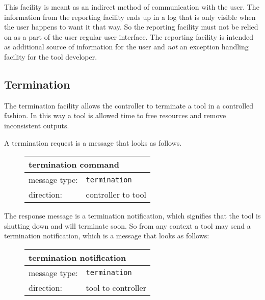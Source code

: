 \documentclass{article}
\newcommand{\msg}[1]{\texttt{#1}}
\begin{document}
   \noindent This facility is meant as an indirect method of communication with
   the user. The information from the reporting facility ends up in a log that
   is only visible when the user happens to want it that way. So the reporting
   facility must not be relied on as a part of the user regular user interface.
   The reporting facility is intended as additional source of information for
   the user and \emph{not} an exception handling facility for the tool
   developer.

  \subsection{Termination}

   The termination facility allows the controller to terminate a tool in a
   controlled fashion.  In this way a tool is allowed time to free resources
   and remove inconsistent outputs.
   
   \noindent A termination request is a message that looks as follows.

   \begin{figure}[H]
    \begin{center}
     \begin{tabular}{|ll|}
      \hline
       \multicolumn{2}{|l|}{\textbf{termination command}} \\
      \hline
       message type:    & \msg{termination} \\
      \hline
       direction:       & controller to tool \\
      \hline
     \end{tabular}
    \end{center}
   \end{figure}
   \vspace{-0.5cm}

   \noindent The response message is a termination notification, which
   signifies that the tool is shutting down and will terminate soon.  So from
   any context a tool may send a termination notification, which is a message
   that looks as follows:

   \begin{figure}[H]
    \begin{center}
     \begin{tabular}{|ll|}
      \hline
       \multicolumn{2}{|l|}{\textbf{termination notification}} \\
      \hline
       message type:   & \msg{termination} \\
      \hline
       direction:      & tool to controller \\
      \hline
     \end{tabular}
    \end{center}
   \end{figure}
   \vspace{-0.5cm}
\end{document}
